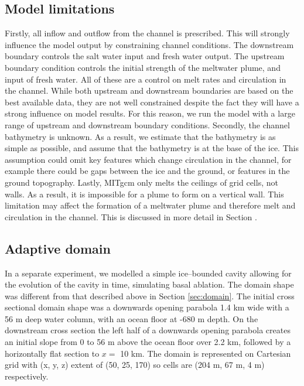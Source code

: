 
\subsection{Model limitations}
Firstly, all inflow and outflow from the channel is prescribed. This will strongly influence the model output by constraining channel conditions. The downstream boundary controls the salt water input and fresh water output. The upstream boundary condition controls the initial strength of the meltwater plume, and input of fresh water. All of these are a control on melt rates and circulation in the channel. While both upstream and downstream boundaries are based on the best available data, they are not well constrained despite the fact they will have a strong influence on model results. For this reason, we run the model with a large range of upstream and downstream boundary conditions.
Secondly, the channel bathymetry is unknown. As a result, we estimate that the bathymetry is as simple as possible, and assume that the bathymetry is at the base of the ice. This assumption could omit key features which change circulation in the channel, for example there could be gaps between the ice and the ground, or features in the ground topography.
Lastly, MITgcm only melts the ceilings of grid cells, not walls. As a result, it is impossible for a plume to form on a vertical wall. This limitation may affect the formation of a meltwater plume and therefore melt and circulation in the channel. This is discussed in more detail in Section \label{ocean_discuss}. 

\subsection{Adaptive domain} \label{sec:ablation_iterator}

In a separate experiment, we modelled a simple ice--bounded cavity allowing for the evolution of the cavity in time, simulating basal ablation. The domain shape was different from that described above in Section \ref{sec:domain}. The initial cross sectional domain shape was a downwards opening parabola 1.4 km wide with a 56 m deep water column, with an ocean floor at -680 m depth. On the downstream cross section the left half of a downwards opening parabola creates an initial slope from 0 to 56 m above the ocean floor over 2.2 km, followed by a horizontally flat section to $x=$  10 km. The domain is represented on Cartesian grid with (x, y, z) extent of (50, 25, 170) so cells are (204 m, 67 m, 4 m) respectively.

